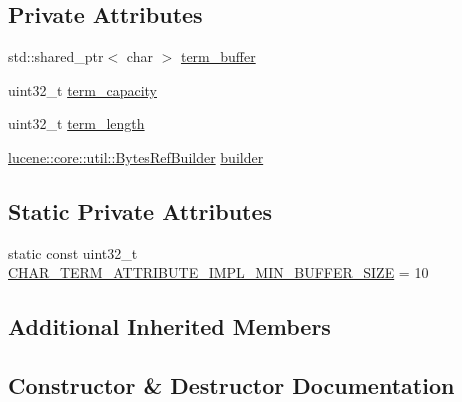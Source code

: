 \subsection*{Private Attributes}
\begin{DoxyCompactItemize}
\item 
std\+::shared\+\_\+ptr$<$ char $>$ \mbox{\hyperlink{classlucene_1_1core_1_1analysis_1_1tokenattributes_1_1CharTermAttributeImpl_a9a4ece35b434c726c23ea3e1f0b46514}{term\+\_\+buffer}}
\item 
uint32\+\_\+t \mbox{\hyperlink{classlucene_1_1core_1_1analysis_1_1tokenattributes_1_1CharTermAttributeImpl_aa62aff36d884a989746a4de2cc12e921}{term\+\_\+capacity}}
\item 
uint32\+\_\+t \mbox{\hyperlink{classlucene_1_1core_1_1analysis_1_1tokenattributes_1_1CharTermAttributeImpl_a746eb5a710afd01df9c4170ea0e0ce3e}{term\+\_\+length}}
\item 
\mbox{\hyperlink{classlucene_1_1core_1_1util_1_1BytesRefBuilder}{lucene\+::core\+::util\+::\+Bytes\+Ref\+Builder}} \mbox{\hyperlink{classlucene_1_1core_1_1analysis_1_1tokenattributes_1_1CharTermAttributeImpl_a1599ca8cd8221d3970fdb6d3d5f763a9}{builder}}
\end{DoxyCompactItemize}
\subsection*{Static Private Attributes}
\begin{DoxyCompactItemize}
\item 
static const uint32\+\_\+t \mbox{\hyperlink{classlucene_1_1core_1_1analysis_1_1tokenattributes_1_1CharTermAttributeImpl_af41df146fa133bcc320a7d281c559ae7}{C\+H\+A\+R\+\_\+\+T\+E\+R\+M\+\_\+\+A\+T\+T\+R\+I\+B\+U\+T\+E\+\_\+\+I\+M\+P\+L\+\_\+\+M\+I\+N\+\_\+\+B\+U\+F\+F\+E\+R\+\_\+\+S\+I\+ZE}} = 10
\end{DoxyCompactItemize}
\subsection*{Additional Inherited Members}


\subsection{Constructor \& Destructor Documentation}
\mbox{\label{classlucene_1_1core_1_1analysis_1_1tokenattributes_1_1CharTermAttributeImpl_a3f0f1dfd6edd1686f46fa84b95b17959}} 

